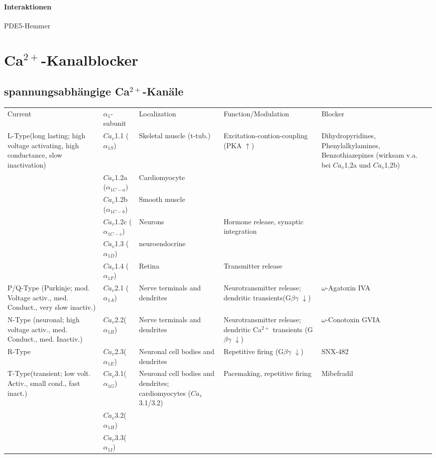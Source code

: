 \documentclass[10pt,a4paper]{report}
\begin{document}
\paragraph{Interaktionen} PDE5-Hemmer

\section{Ca$^{2+}$-Kanalblocker}
\subsection{spannungsabhängige Ca$^{2+}$-Kanäle}
\begin{tabularx}{\textwidth}{XXXXX}
Current&$\alpha_1$-subunit&Localization&Function/Modulation&Blocker\\
L-Type(long lasting; high voltage activating, high conductance, slow inactivation)&$Ca_v$1.1 ($\alpha_{1S}$)&Skeletal muscle (t-tub.)&Excitation-contion-coupling
(PKA $\uparrow$)&Dihydropyridines, Phenylalkylamines, Benzothiazepines (wirksam v.a. bei $Ca_v$1,2a und $Ca_v$1,2b)\\
&$Ca_v$1.2a ($\alpha_{1C-a}$)&Cardiomyocyte&&\\
&$Ca_v$1.2b ($\alpha_{1C-b}$)&Smooth muscle&&\\
&$Ca_v$1.2c ($\alpha_{1C-c}$)&Neurons&Hormone release, synaptic integration&\\
&$Ca_v$1.3 ($\alpha_{1D}$)&neuroendocrine&&\\
&$Ca_v$1.4 ($\alpha_{1F}$)&Retina&Transmitter release&\\
P/Q-Type (Purkinje; mod. Voltage activ., med. Conduct., very slow inactiv.)&$Ca_v$2.1 ($\alpha_{1A}$)&Nerve terminals and dendrites&Neurotransmitter release; dendritic  transients(G$\beta\gamma$ $\downarrow$)&$\omega$-Agatoxin IVA\\
N-Type (neuronal; high voltage activ., med. Conduct., med. Inactiv.)&$Ca_v$2.2($\alpha_{1B}$)&Nerve terminals and dendrites&Neurotransmitter release; dendritic Ca$^{2+}$ transients (G$\beta\gamma$ $\downarrow$)&$\omega$-Conotoxin GVIA\\
R-Type&$Ca_v$2.3($\alpha_{1E}$)&Neuronal cell bodies and dendrites&Repetitive firing (G$\beta\gamma$ $\downarrow$)&SNX-482\\
T-Type(transient; low volt. Activ., small cond., fast inact.)&$Ca_v$3.1($\alpha_{1G}$)&Neuronal cell bodies and dendrites; cardiomyocytes ($Ca_v$3.1/3.2)&Pacemaking, repetitive firing&Mibefradil\\
&$Ca_v$3.2($\alpha_{1H}$)&&&\\
&$Ca_v$3.3($\alpha_{1I}$)&&&\\
\end{tabularx}
\end{document}
